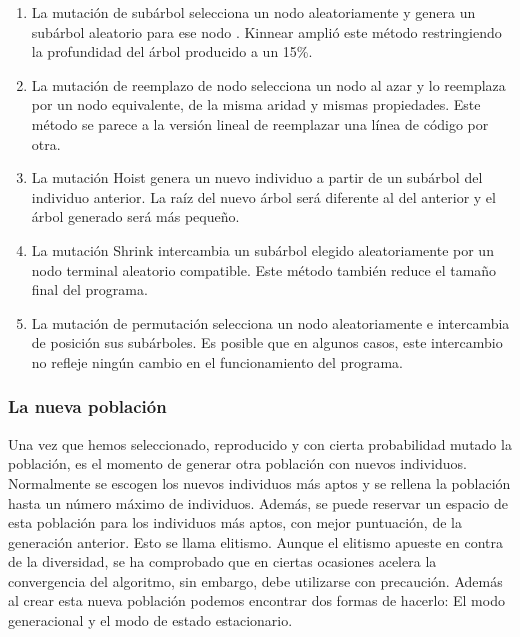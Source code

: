  \begin{enumerate}
    \item La mutación de subárbol selecciona un nodo aleatoriamente y genera un
    subárbol aleatorio para ese nodo \cite{Koza:1992}.
    Kinnear \cite{Kinnear:1993} amplió este método restringiendo la profundidad
    del árbol producido a un 15\%.

	\item La mutación de reemplazo de nodo selecciona un nodo al azar y lo
	reemplaza por un nodo equivalente, de la misma aridad y mismas propiedades. Este método se parece a la versión lineal de reemplazar una línea de código
por otra.

	\item La mutación Hoist genera un nuevo individuo a partir de un subárbol del
individuo anterior. La raíz del nuevo árbol será diferente al del anterior y el árbol generado será más pequeño.

	\item La mutación Shrink intercambia un subárbol elegido aleatoriamente por un
nodo terminal aleatorio compatible. Este método también reduce el tamaño final del programa.


	\item La mutación de permutación selecciona un nodo aleatoriamente e
intercambia de posición sus subárboles. Es posible que en algunos casos, este intercambio no refleje ningún cambio en el funcionamiento del programa.

\end{enumerate}

\subsubsection{La nueva población}

Una vez que hemos seleccionado, reproducido y con cierta probabilidad mutado la
población, es el momento de generar otra población con nuevos individuos.
Normalmente se escogen los nuevos individuos más aptos y se rellena la población
hasta un número máximo de individuos. Además, se puede reservar un espacio de
esta población para los individuos más aptos, con mejor puntuación, de la
generación anterior. Esto se llama elitismo. Aunque el elitismo apueste en contra
de  la diversidad, se ha comprobado que en ciertas ocasiones acelera la
convergencia del algoritmo, sin embargo, debe utilizarse con precaución. Además
al crear esta nueva población podemos encontrar dos formas de hacerlo: El modo
generacional y el modo de estado estacionario.


